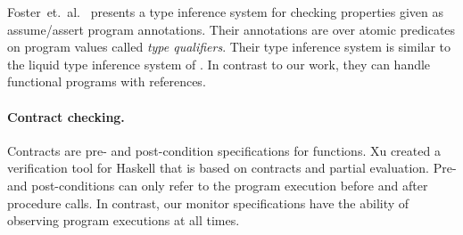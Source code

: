 {Foster~et.~al.~\cite{Terauchi02} presents a type inference system
for checking properties given as assume/assert program
annotations. Their annotations are over atomic predicates on program
values called \emph{type qualifiers}. Their type inference system is
similar to the liquid type inference system of \dsolve. In contrast to
our work, they can handle functional programs with references.



 


\paragraph{Contract checking.}

Contracts are pre- and post-condition specifications for
functions. Xu created a verification tool \cite{DanaPhd} for Haskell that is
based on contracts and partial evaluation. 
Pre- and post-conditions can only refer to the program execution
before and after procedure calls. In contrast, our monitor
specifications have the ability of observing program executions at all times.

}

